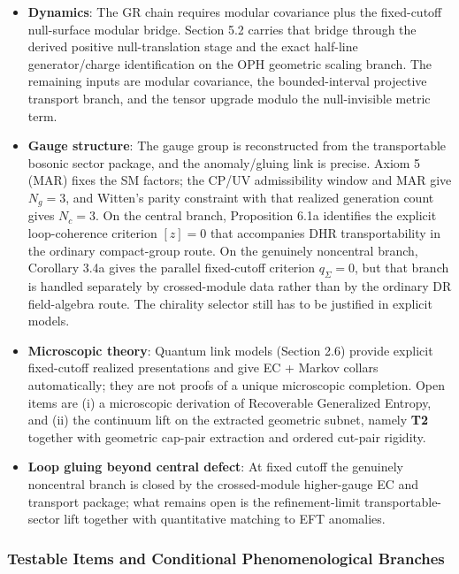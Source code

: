 \begin{itemize}
\tightlist
\item
  \textbf{Dynamics}: The GR chain requires modular covariance plus the fixed-cutoff null-surface modular bridge. Section 5.2 carries that bridge through the derived positive null-translation stage and the exact half-line generator/charge identification on the OPH geometric scaling branch. The remaining inputs are modular covariance, the bounded-interval projective transport branch, and the tensor upgrade modulo the null-invisible metric term.
\item
  \textbf{Gauge structure}: The gauge group is reconstructed from the transportable bosonic sector package, and the anomaly/gluing link is precise. Axiom 5 (MAR) fixes the SM factors; the CP/UV admissibility window and MAR give \(N_g = 3\), and Witten's parity constraint with that realized generation count gives \(N_c = 3\). On the central branch, Proposition 6.1a identifies the explicit loop-coherence criterion \([z]=0\) that accompanies DHR transportability in the ordinary compact-group route. On the genuinely noncentral branch, Corollary 3.4a gives the parallel fixed-cutoff criterion \(q_\Sigma=0\), but that branch is handled separately by crossed-module data rather than by the ordinary DR field-algebra route. The chirality selector still has to be justified in explicit models.
\item
  \textbf{Microscopic theory}: Quantum link models (Section 2.6) provide explicit fixed-cutoff realized presentations and give EC + Markov collars automatically; they are not proofs of a unique microscopic completion. Open items are (i) a microscopic derivation of Recoverable Generalized Entropy, and (ii) the continuum lift on the extracted geometric subnet, namely \textbf{T2} together with geometric cap-pair extraction and ordered cut-pair rigidity.
\item
  \textbf{Loop gluing beyond central defect}: At fixed cutoff the genuinely noncentral branch is closed by the crossed-module higher-gauge EC and transport package; what remains open is the refinement-limit transportable-sector lift together with quantitative matching to EFT anomalies.
\end{itemize}

\subsubsection{Testable Items and Conditional Phenomenological Branches}\label{83-novel-testable-predictions}

